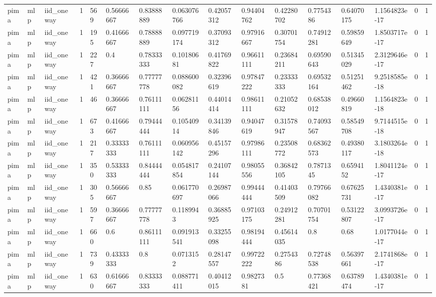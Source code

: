 \begin{tabular}{llllllllllllllll}
pima & mlp & iid\_oneway & 1 & 569 & 0.56666667 & 0.83888889 & 0.063076766 & 0.42057312 & 0.94404762 & 0.42280702 & 0.7754386 & 0.64070175 & 1.1564823e-17 & 0 & 1 \\
pima & mlp & iid\_oneway & 1 & 195 & 0.41666667 & 0.78888889 & 0.097719174 & 0.37093312 & 0.97916667 & 0.30701754 & 0.74912281 & 0.59859649 & 1.8503717e-17 & 0 & 1 \\
pima & mlp & iid\_oneway & 1 & 227 & 0.4 & 0.78333333 & 0.10180681 & 0.41769822 & 0.96611111 & 0.23684211 & 0.69590643 & 0.51345029 & 2.3129646e-17 & 0 & 1 \\
pima & mlp & iid\_oneway & 1 & 421 & 0.36666667 & 0.77777778 & 0.088600082 & 0.32396619 & 0.97847222 & 0.23333333 & 0.69532164 & 0.51251462 & 9.2518585e-18 & 0 & 1 \\
pima & mlp & iid\_oneway & 1 & 46 & 0.36666667 & 0.76111111 & 0.06281156 & 0.44014414 & 0.98611111 & 0.21052632 & 0.68538012 & 0.49660819 & 1.1564823e-18 & 0 & 1 \\
pima & mlp & iid\_oneway & 1 & 673 & 0.41666667 & 0.79444444 & 0.10540914 & 0.34139846 & 0.94047619 & 0.31578947 & 0.74093567 & 0.58549708 & 9.7144515e-18 & 0 & 1 \\
pima & mlp & iid\_oneway & 1 & 217 & 0.33333333 & 0.76111111 & 0.060956142 & 0.45157296 & 0.97986111 & 0.23508772 & 0.68362573 & 0.49380117 & 3.1803264e-18 & 0 & 1 \\
pima & mlp & iid\_oneway & 1 & 350 & 0.53333333 & 0.84444444 & 0.054817854 & 0.24107144 & 0.98055556 & 0.36842105 & 0.7871345 & 0.6594152 & 1.8041124e-17 & 0 & 1 \\
pima & mlp & iid\_oneway & 1 & 305 & 0.56666667 & 0.85 & 0.061770697 & 0.26987066 & 0.99444444 & 0.41403509 & 0.79766082 & 0.67625731 & 1.4340381e-17 & 0 & 1 \\
pima & mlp & iid\_oneway & 1 & 597 & 0.36666667 & 0.77777778 & 0.1189943 & 0.36885925 & 0.97103175 & 0.24912281 & 0.70701754 & 0.53122807 & 3.0993726e-17 & 0 & 1 \\
pima & mlp & iid\_oneway & 1 & 660 & 0.6 & 0.86111111 & 0.091913541 & 0.33255098 & 0.98194444 & 0.45614035 & 0.8 & 0.68 & 1.0177044e-17 & 0 & 1 \\
pima & mlp & iid\_oneway & 1 & 739 & 0.43333333 & 0.8 & 0.0713152 & 0.28147557 & 0.99722222 & 0.2754386 & 0.72748538 & 0.56397661 & 2.1741868e-17 & 0 & 1 \\
pima & mlp & iid\_oneway & 1 & 630 & 0.61666667 & 0.83333333 & 0.088771411 & 0.40412015 & 0.9827381 & 0.5 & 0.77368421 & 0.63789474 & 1.4340381e-17 & 0 & 1 \\

\end{tabular}
